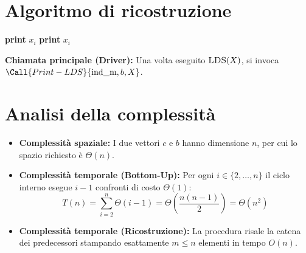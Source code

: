 \section{Algoritmo di ricostruzione}
\begin{algorithm}[htbp]
\caption{Ricostruzione della sequenza LDS}
\begin{algorithmic}[1]
        \State \textbf{print} $x_i$
    \Else
        \State {}
        \State \textbf{print} $x_i$
    \EndIf
\EndProcedure
\end{algorithmic}
\end{algorithm}

\noindent
\textbf{Chiamata principale (Driver):} Una volta eseguito $\textsc{LDS}(X)$, si invoca $\Call{Print-LDS}{\text{ind\_m}, b, X}$.

\section{Analisi della complessità}
\begin{itemize}
    \item \textbf{Complessità spaziale:} I due vettori $c$ e $b$ hanno dimensione $n$, per cui lo spazio richiesto è $\Theta(n)$.
    \item \textbf{Complessità temporale (Bottom-Up):} Per ogni $i \in \{2, \dots, n\}$ il ciclo interno esegue $i - 1$ confronti di costo $\Theta(1)$:
    \[
        T(n) = \sum_{i=2}^{n} \Theta(i - 1) = \Theta\!\left(\frac{n(n-1)}{2}\right) = \Theta(n^2)
    \]
    \item \textbf{Complessità temporale (Ricostruzione):} La procedura risale la catena dei predecessori stampando esattamente $m \le n$ elementi in tempo $O(n)$.
\end{itemize}